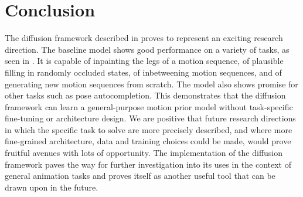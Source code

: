 \section{Conclusion}
\label{sec:diffusion_conclusion}

The diffusion framework described in  proves to represent an exciting research direction. The baseline model shows good performance on a variety of tasks, as seen in . It is capable of inpainting the legs of a motion sequence, of plausible filling in randomly occluded states, of inbetweening motion sequences, and of generating new motion sequences from scratch. The model also shows promise for other tasks such as pose autocompletion. This demonstrates that the diffusion framework can learn a general-purpose motion prior model without task-specific fine-tuning or architecture design. We are positive that future research directions in which the specific task to solve are more precisely described, and where more fine-grained architecture, data and training choices could be made, would prove fruitful avenues with lots of opportunity. The implementation of the diffusion framework paves the way for further investigation into its uses in the context of general animation tasks and proves itself as another useful tool that can be drawn upon in the future.
